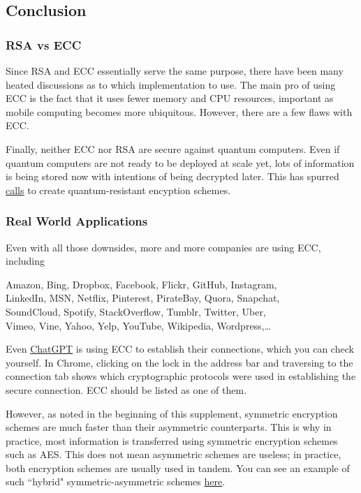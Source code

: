 \documentclass{article}
\begin{document}
\subsection*{Conclusion}

    \subsubsection*{RSA vs ECC}

    Since RSA and ECC essentially serve the same purpose, there have been many heated discussions as to which implementation to use. The main pro of using ECC is the fact that it uses fewer memory and CPU resources, important as mobile computing becomes more ubiquitous. However, there are a few flaws with ECC.
    
    \vspace{2mm}
    Finally, neither ECC nor RSA are secure against quantum computers. Even if quantum computers are not ready to be deployed at scale yet, lots of information is being stored now with intentions of being decrypted later. This has spurred \href{https://csrc.nist.gov/projects/post-quantum-cryptography}{calls} to create quantum-resistant encyption schemes.

    \subsubsection*{Real World Applications}

    Even with all those downsides, more and more companies are using ECC, including

    \begin{center}
        Amazon, Bing, Dropbox, Facebook, Flickr, GitHub, Instagram, \\
        LinkedIn, MSN, Netflix, Pinterest, PirateBay, Quora, Snapchat, \\
        SoundCloud, Spotify, StackOverflow, Tumblr, Twitter, Uber, \\
        Vimeo, Vine, Yahoo, Yelp, YouTube, Wikipedia, Wordpress,\dots
    \end{center}
    Even \href{https://chat.openai.com/chat}{ChatGPT} is using ECC to establish their connections, which you can check yourself. In Chrome, clicking on the lock in the address bar and traversing to the connection tab shows which cryptographic protocols were used in establishing the secure connection. ECC should be listed as one of them.

    \vspace{3mm}
    However, as noted in the beginning of this supplement, symmetric encryption schemes are much faster than their asymmetric counterparts. This is why in practice, most information is transferred using symmetric encryption schemes such as AES. This does not mean asymmetric schemes are useless; in practice, both encryption schemes are usually used in tandem. You can see an example of such ``hybrid" symmetric-asymmetric schemes \href{https://github.com/nakov/Practical-Cryptography-for-Developers-Book/blob/master/asymmetric-key-ciphers/ecc-encryption-decryption.md}{here}.
\end{document}
